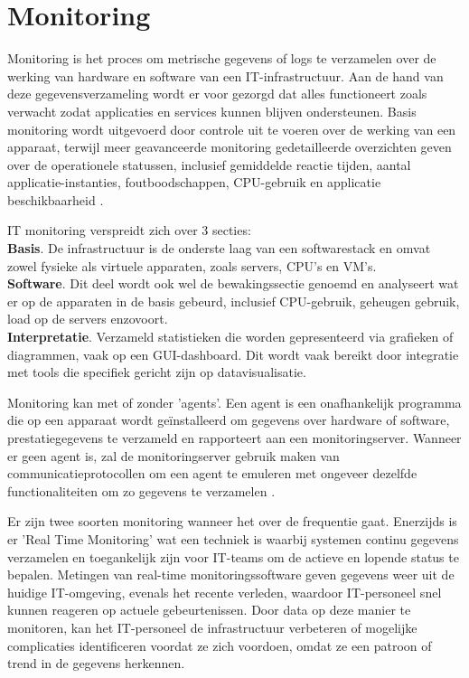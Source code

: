 \section{Monitoring}
Monitoring is het proces om metrische gegevens of logs te verzamelen over de werking van hardware en software van een IT-infrastructuur. Aan de hand van deze gegevensverzameling wordt er voor gezorgd dat alles functioneert zoals verwacht zodat applicaties en services kunnen blijven ondersteunen. Basis monitoring wordt uitgevoerd door controle uit te voeren over de werking van een apparaat, terwijl meer geavanceerde monitoring gedetailleerde overzichten geven over de operationele statussen, inclusief gemiddelde reactie tijden, aantal applicatie-instanties, foutboodschappen, CPU-gebruik en applicatie beschikbaarheid \autocite{TechTarget2020}.

IT monitoring verspreidt zich over 3 secties:\\
\textbf{Basis}. De infrastructuur is de onderste laag van een softwarestack en omvat zowel fysieke als virtuele apparaten, zoals servers, CPU's en VM's. \\
\textbf{Software}. Dit deel wordt ook wel de bewakingssectie genoemd en  analyseert wat er op de apparaten in de basis gebeurd, inclusief CPU-gebruik, geheugen gebruik, load op de servers enzovoort.\\
\textbf{Interpretatie}. Verzameld statistieken die worden gepresenteerd via grafieken of diagrammen, vaak op een GUI-dashboard. Dit wordt vaak bereikt door integratie met tools die specifiek gericht zijn op datavisualisatie.

Monitoring kan met of zonder 'agents'. Een agent is een onafhankelijk programma die op een apparaat wordt geïnstalleerd om gegevens over hardware of software, prestatiegegevens te verzameld en rapporteert aan een monitoringserver. Wanneer er geen agent is, zal de monitoringserver gebruik maken van communicatieprotocollen om een agent te emuleren met ongeveer dezelfde functionaliteiten om zo gegevens te verzamelen \autocite{TechTarget2020}.

Er zijn twee soorten monitoring wanneer het over de frequentie gaat. Enerzijds is er 'Real Time Monitoring' wat een techniek is waarbij systemen continu gegevens verzamelen en toegankelijk zijn voor IT-teams om de actieve en lopende status te bepalen. Metingen van real-time monitoringssoftware geven gegevens weer uit de huidige IT-omgeving, evenals het recente verleden, waardoor IT-personeel snel kunnen reageren op actuele gebeurtenissen. Door data op deze manier te monitoren, kan het IT-personeel de infrastructuur verbeteren of mogelijke complicaties identificeren voordat ze zich voordoen, omdat ze een patroon of trend in de gegevens herkennen. 

